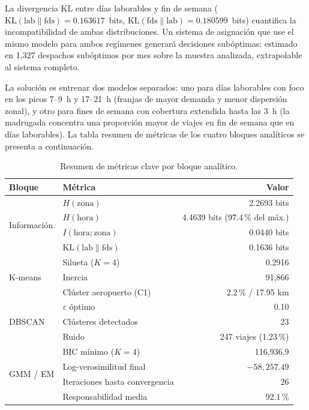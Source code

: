 \documentclass[12pt, a4paper]{article}
\begin{document}
La divergencia KL entre días laborables y fin de semana ($\text{KL}(\text{lab}\!\parallel\!\text{fds}) = 0{.}163617$~bits, $\text{KL}(\text{fds}\!\parallel\!\text{lab}) = 0{.}180599$~bits) cuantifica la incompatibilidad de ambas distribuciones. Un sistema de asignación que use el mismo modelo para ambos regímenes generará decisiones subóptimas: estimado en 1{,}327 despachos subóptimos por mes sobre la muestra analizada, extrapolable al sistema completo.

La solución es entrenar dos modelos separados: uno para días laborables con foco en los picos 7--9~h y 17--21~h (franjas de mayor demanda y menor dispersión zonal), y otro para fines de semana con cobertura extendida hasta las 3~h (la madrugada concentra una proporción mayor de viajes en fin de semana que en días laborables). La tabla resumen de métricas de los cuatro bloques analíticos se presenta a continuación.

\begin{table}[H]
  \centering
  \caption{Resumen de métricas clave por bloque analítico.}
  \label{tab:resumen}
  \small
  \begin{tabular}{llr}
    \toprule
    \textbf{Bloque} & \textbf{Métrica} & \textbf{Valor} \\
    \midrule
    \multirow{4}{*}{Información}
      & $H(\text{zona})$                        & 2{.}2693 bits \\
      & $H(\text{hora})$                        & 4{.}4639 bits (97{.}4\,\% del máx.) \\
      & $I(\text{hora};\text{zona})$            & 0{.}0440 bits \\
      & $\text{KL}(\text{lab}\!\parallel\!\text{fds})$ & 0{.}1636 bits \\
    \midrule
    \multirow{3}{*}{K-means}
      & Silueta ($K=4$)                         & 0{.}2916 \\
      & Inercia                                  & 91{,}866 \\
      & Clúster aeropuerto (C1)                 & 2{.}2\,\% / 17{.}95 km \\
    \midrule
    \multirow{3}{*}{DBSCAN}
      & $\varepsilon$ óptimo                    & 0{.}10 \\
      & Clústeres detectados                    & 23 \\
      & Ruido                                   & 247 viajes (1{.}23\,\%) \\
    \midrule
    \multirow{4}{*}{GMM / EM}
      & BIC mínimo ($K=4$)                      & 116{,}936{.}9 \\
      & Log-verosimilitud final                 & $-58{,}257{.}49$ \\
      & Iteraciones hasta convergencia          & 26 \\
      & Responsabilidad media                   & 92{.}1\,\% \\
    \bottomrule
  \end{tabular}
\end{table}
\end{document}
